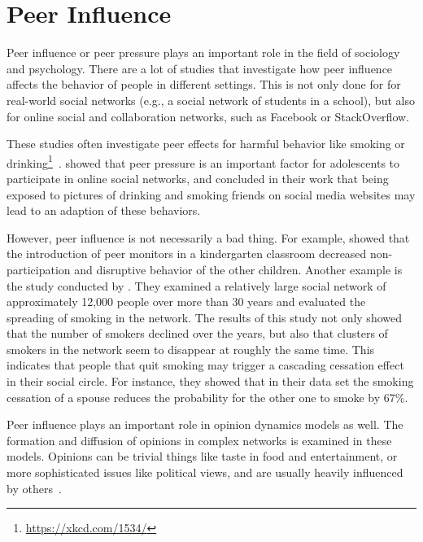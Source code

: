 

\section{Peer Influence}
\label{sec:peer-influence}

Peer influence or peer pressure plays an important role in the field of sociology and psychology.
There are a lot of studies that investigate how peer influence affects the behavior of people in different settings.
This is not only done for for real-world social networks (e.g., a social network of students in a school), but also for online social and collaboration networks, such as Facebook or StackOverflow.

These studies often investigate peer effects for harmful behavior like smoking or drinking\footnote{\url{https://xkcd.com/1534/}}~\cite{Simons2001, Powell2005}.
\citet{Krasnova2008} showed that peer pressure is an important factor for adolescents to participate in online social networks, and \citet{Huang2014} concluded in their work that being exposed to pictures of drinking and smoking friends on social media websites may lead to an adaption of these behaviors.

However, peer influence is not necessarily a bad thing.
For example, \citet{Smith1984} showed that the introduction of peer monitors in a kindergarten classroom decreased non-participation and disruptive behavior of the other children.
Another example is the study conducted by \citet{Christakis2008}.
They examined a relatively large social network of approximately 12,000 people over more than 30 years and evaluated the spreading of smoking in the network.
The results of this study  not only showed that the number of smokers declined over the years, but also that clusters of smokers in the network seem to disappear at roughly the same time.
This indicates that people that quit smoking may trigger a cascading cessation effect in their social circle.
For instance, they showed that in their data set the smoking cessation of a spouse reduces the probability for the other one to smoke by 67\%.

Peer influence plays an important role in opinion dynamics models as well.
The formation and diffusion of opinions in complex networks is examined in these models.
Opinions can be trivial things like taste in food and entertainment, or more sophisticated issues like political views, and are usually heavily influenced by others~\cite{Acemoglu2011}.

